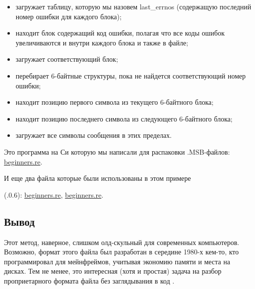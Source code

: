 \begin{itemize}
\item загружает таблицу, которую мы назовем last\_errnos 
(содержащую последний номер ошибки для каждого блока);

\item находит блок содержащий код ошибки, полагая что все коды ошибок увеличиваются и внутри каждого блока
и также в файле;

\item загружает соответствующий блок;

\item перебирает 6-байтные структуры, пока не найдется соответствующий номер ошибки;

\item находит позицию первого символа из текущего 6-байтного блока;

\item находит позицию последнего символа из следующего 6-байтного блока;

\item загружает все символы сообщения в этих пределах.
\end{itemize}

Это программа на Си которую мы написали для распаковки .MSB-файлов:
\href{http://go.yurichev.com/17213}{beginners.re}.

И еще два файла которые были использованы в этом примере
 
(.0.6):
\href{http://go.yurichev.com/17214}{beginners.re},
\href{http://go.yurichev.com/17215}{beginners.re}.

\subsection{Вывод}

Этот метод, наверное, слишком олд-скульный для современных компьютеров.
Возможно, формат этого файла был разработан в середине 1980-х кем-то, кто программировал для мейнфреймов,
учитывая экономию памяти и места на дисках.
Тем не менее, это интересная (хотя и простая) задача на разбор проприетарного формата файла без
заглядывания в код \oracle.
